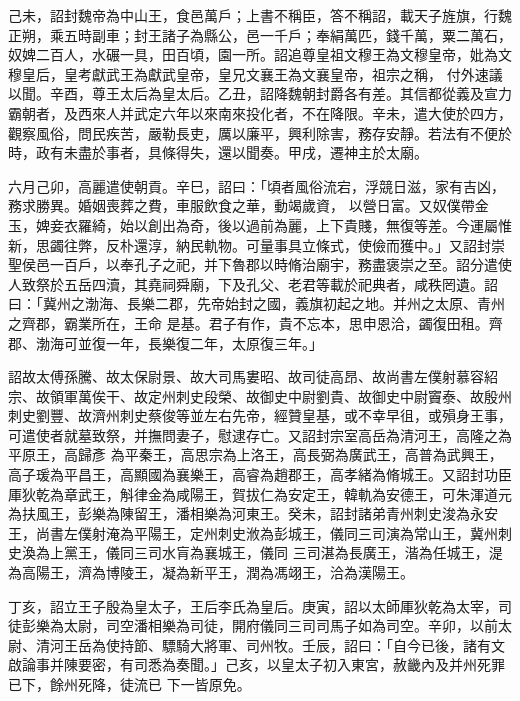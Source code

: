 \begin{pinyinscope}
 己未，詔封魏帝為中山王，食邑萬戶；上書不稱臣，答不稱詔，載天子旌旗，行魏正朔，乘五時副車；封王諸子為縣公，邑一千戶；奉絹萬匹，錢千萬，粟二萬石，奴婢二百人，水碾一具，田百頃，園一所。詔追尊皇祖文穆王為文穆皇帝，妣為文穆皇后，皇考獻武王為獻武皇帝，皇兄文襄王為文襄皇帝，祖宗之稱，
 付外速議以聞。辛酉，尊王太后為皇太后。乙丑，詔降魏朝封爵各有差。其信都從義及宣力霸朝者，及西來人并武定六年以來南來投化者，不在降限。辛未，遣大使於四方，觀察風俗，問民疾苦，嚴勒長吏，厲以廉平，興利除害，務存安靜。若法有不便於時，政有未盡於事者，具條得失，還以聞奏。甲戌，遷神主於太廟。



 六月己卯，高麗遣使朝貢。辛巳，詔曰：「頃者風俗流宕，浮競日滋，家有吉凶，務求勝異。婚姻喪葬之費，車服飲食之華，動竭歲資，
 以營日富。又奴僕帶金玉，婢妾衣羅綺，始以創出為奇，後以過前為麗，上下貴賤，無復等差。今運屬惟新，思蠲往弊，反朴還淳，納民軌物。可量事具立條式，使儉而獲中。」又詔封崇聖侯邑一百戶，以奉孔子之祀，并下魯郡以時脩治廟宇，務盡褒崇之至。詔分遣使人致祭於五岳四瀆，其堯祠舜廟，下及孔父、老君等載於祀典者，咸秩罔遺。詔曰：「冀州之渤海、長樂二郡，先帝始封之國，義旗初起之地。并州之太原、青州之齊郡，霸業所在，王命
 是基。君子有作，貴不忘本，思申恩洽，蠲復田租。齊郡、渤海可並復一年，長樂復二年，太原復三年。」



 詔故太傅孫騰、故太保尉景、故大司馬婁昭、故司徒高昂、故尚書左僕射慕容紹宗、故領軍萬俟干、故定州刺史段榮、故御史中尉劉貴、故御史中尉竇泰、故殷州刺史劉豐、故濟州刺史蔡俊等並左右先帝，經贊皇基，或不幸早徂，或殞身王事，可遣使者就墓致祭，并撫問妻子，慰逮存亡。又詔封宗室高岳為清河王，高隆之為平原王，高歸彥
 為平秦王，高思宗為上洛王，高長弼為廣武王，高普為武興王，高子瑗為平昌王，高顯國為襄樂王，高睿為趙郡王，高孝緒為脩城王。又詔封功臣厙狄乾為章武王，斛律金為咸陽王，賀拔仁為安定王，韓軌為安德王，可朱渾道元為扶風王，彭樂為陳留王，潘相樂為河東王。癸未，詔封諸弟青州刺史浚為永安王，尚書左僕射淹為平陽王，定州刺史浟為彭城王，儀同三司演為常山王，冀州刺史渙為上黨王，儀同三司水肓為襄城王，儀同
 三司湛為長廣王，湝為任城王，湜為高陽王，濟為博陵王，凝為新平王，潤為馮翊王，洽為漢陽王。



 丁亥，詔立王子殷為皇太子，王后李氏為皇后。庚寅，詔以太師厙狄乾為太宰，司徒彭樂為太尉，司空潘相樂為司徒，開府儀同三司司馬子如為司空。辛卯，以前太尉、清河王岳為使持節、驃騎大將軍、司州牧。壬辰，詔曰：「自今已後，諸有文啟論事并陳要密，有司悉為奏聞。」己亥，以皇太子初入東宮，赦畿內及并州死罪已下，餘州死降，徒流已
 下一皆原免。




\end{pinyinscope}
